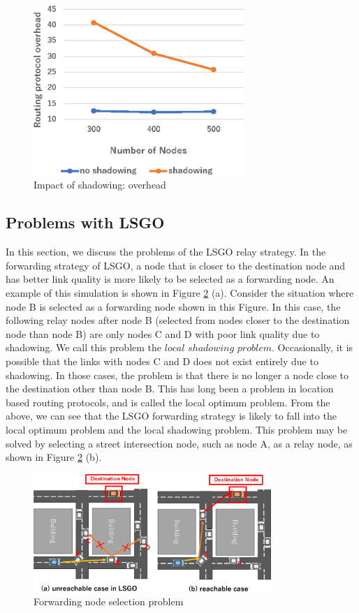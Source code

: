 \documentclass[conference]{IEEEtran}
\begin{document}
\begin{figure}[!ht]
\centering
\includegraphics[width=80mm]{figures/LSGO_overhead.eps}
\caption{Impact of shadowing: overhead}
\label{fig:LSGO-overhead}
\end{figure}

\subsection{Problems with LSGO}

In this section, we discuss the problems of the LSGO relay strategy.  
In the forwarding strategy of LSGO, a node that is closer to the destination node and has better link quality is more likely to be selected as a forwarding node. 
An example of this simulation is shown in Figure \ref{fig:LSGO-route} (a). 
Consider the situation where node B is selected as a forwarding node shown in this Figure. 
In this case, the following relay nodes after node B (selected from nodes closer to the destination node than node B) are only nodes C and D with poor link quality due to shadowing.  
We call this problem the $local$ $shadowing$ $problem$. 
Occasionally, it is possible  that the links with nodes C and D does not exist entirely  due to  shadowing. 
In those cases, the problem is that there is no longer a node close to the destination other than  node B. 
This has long been a problem in  location based routing protocols, and is called the local optimum problem. 
From the above, we can see that the LSGO forwarding strategy is likely to fall into the local optimum problem and the local shadowing problem. This problem may be solved by selecting a street intersection node, such as node A, as a relay node, as shown in Figure \ref{fig:LSGO-route} (b). 




\begin{figure}[!ht]
\centering
\includegraphics[width=90mm]{figures/efficient_route.eps}
\caption{Forwarding node selection problem}
\label{fig:LSGO-route}
\end{figure}
\end{document}
